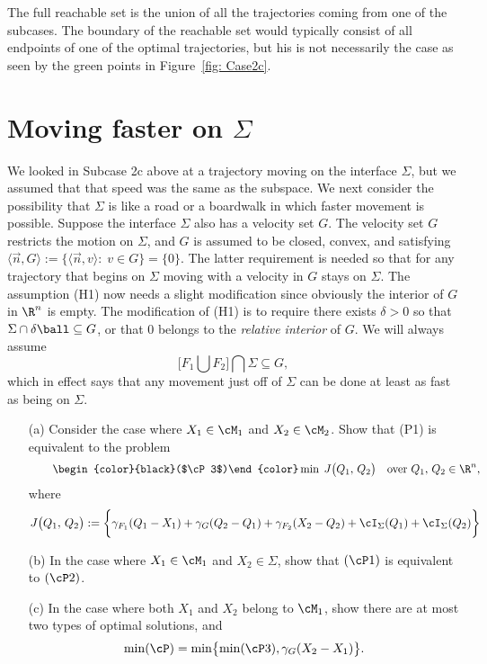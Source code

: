 \documentclass[12pt]{article}
\begin{document}
The full reachable set is the union of all the trajectories coming from one of the subcases.  The boundary of the reachable set would typically consist of all endpoints of one of the optimal trajectories, but his is not necessarily the case as seen by the green points in Figure~\ref{fig: Case2c}.

\section{Moving faster on $\Sigma$}
We looked in Subcase 2c above at a trajectory moving on the interface $\Sigma$, but we assumed that that speed was the same as the subspace.  We next consider the possibility that $\Sigma$ is like a road or a boardwalk in which faster movement is possible. 
Suppose the interface $\Sigma$ also has a velocity set $G$.  The velocity set $G$ restricts the motion on $\Sigma$, and $G$ is assumed to be closed, convex, and satisfying $\langle \vec n,G\rangle:=\bigl\{\langle \vec n,v\rangle:\;v\in G\bigr\}=\{0\}$.  The latter requirement is needed so that for any trajectory that begins on $\Sigma$ moving with a velocity in $G$ stays on $\Sigma$.  The assumption (H1) now needs a slight modification since obviously the interior of $G$ in $\R^n$ is empty.  The modification of (H1) is to require there exists $\delta>0$ so that $\Sigma\cap\delta\ball\subseteq G$, or that $0$ belongs to the {\it relative interior} of $G$.  We will always assume
\begin{equation*}\tag{H2}
\bigl[F_1\bigcup F_2\bigr]\bigcap \Sigma\subseteq G,
\end{equation*}
which in effect says that any movement just off of $\Sigma$ can be done at least as fast as being on $\Sigma$.


{\blue
\begin{exer}\label{Ex: probs}
\begin{itemize}
\item[(a)]  Consider the case where $X_1\in\cM_1$ and $X_2\in\cM_2$.
Show that (P1) is equivalent to the problem
\begin{equation*}\tag*{\begin{color}{black}($\cP3$)\end{color}}
\min\;J\bigl(Q_1,\,Q_2\bigr)\quad\text{over }Q_1,\,Q_2\in\R^n,
\end{equation*}
where
\[
J\bigl(Q_1,\,Q_2\bigr):=\biggl\{\gamma_{F_1}(Q_1-X_1)+\gamma_{G}(Q_2-Q_1)+\gamma_{F_2}(X_2-Q_2) +\cI_{\Sigma}(Q_1)+\cI_{\Sigma}(Q_2)\biggr\}
\]
\item[(b)]  In the case where $X_1\in\cM_1$ and $X_2\in\Sigma$, show that $(\cP1)$ is equivalent to $(\cP2)$.
\item[(c)]  In the case where both $X_1$ and $X_2$ belong to $\cM_1$, show there are at most two types of optimal solutions, and
\[
\min(\cP)=\min\bigl\{\min(\cP3),\gamma_{G}(X_2-X_1)\bigr\}.
\] 
\end{itemize}
\end{exer}}
\end{document}
